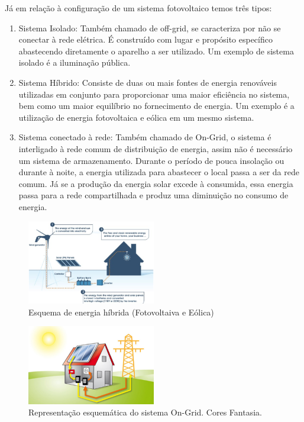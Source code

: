 Já em relação à configuração de um sistema fotovoltaico temos três tipos:

\begin{enumerate}
    \item Sistema Isolado: Também chamado de off-grid, se caracteriza por não se conectar à rede elétrica. É construído com lugar e propósito específico abastecendo diretamente o aparelho a ser utilizado. Um exemplo de sistema isolado é a iluminação pública. 
	\item Sistema Híbrido: Consiste de duas ou mais fontes de energia renováveis utilizadas em conjunto para proporcionar uma maior eficiência no sistema, bem como um maior equilíbrio no fornecimento de energia.  Um exemplo é a utilização de energia fotovoltaica e eólica em um mesmo sistema. 
	\item Sistema conectado à rede: Também chamado de On-Grid, o sistema é interligado à rede comum de distribuição de energia, assim não é necessário um sistema de armazenamento. Durante o período de pouca insolação ou durante à noite, a energia utilizada para abastecer o local passa a ser da rede comum. Já se a produção da energia solar excede à consumida, essa energia passa para a rede compartilhada e produz uma diminuição no consumo de energia. 
\end{enumerate}

\begin{figure}[!h]
\centering
\includegraphics[width=0.5\textwidth]{figuras/esquema.png}
\caption{Esquema de energia híbrida (Fotovoltaiva e Eólica)}
\label{fig:esquema}
\end{figure}

\begin{figure}[!h]
\centering
\includegraphics[width=0.5\textwidth]{figuras/ongrid.png}
\caption{Representação esquemática do sistema On-Grid. Cores Fantasia.}
\label{fig:ongrid}
\end{figure}


